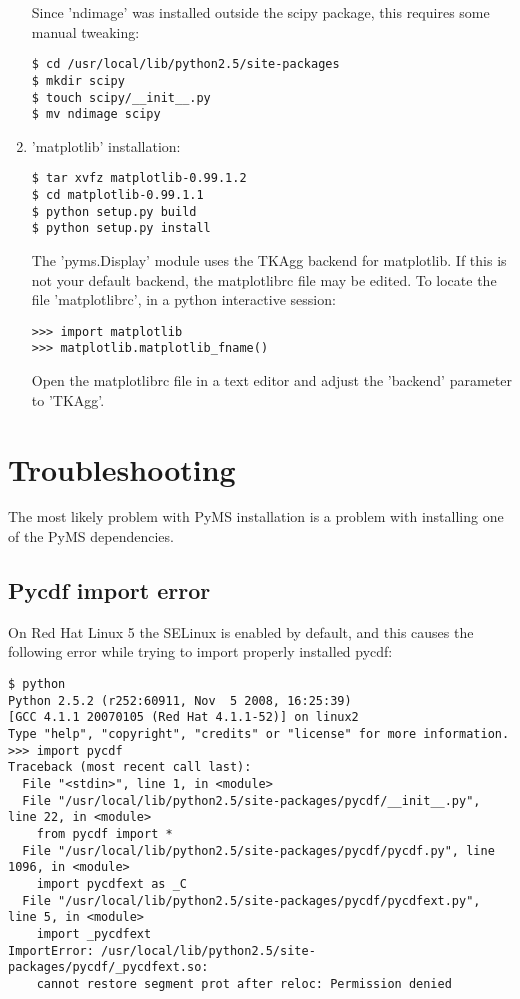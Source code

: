 \begin{enumerate}
\noindent
Since 'ndimage' was installed outside the scipy package, this requires
some manual tweaking:

\begin{verbatim}
$ cd /usr/local/lib/python2.5/site-packages
$ mkdir scipy
$ touch scipy/__init__.py
$ mv ndimage scipy
\end{verbatim}

\item 'matplotlib' installation:

\begin{verbatim}
$ tar xvfz matplotlib-0.99.1.2
$ cd matplotlib-0.99.1.1
$ python setup.py build
$ python setup.py install
\end{verbatim}

\noindent
The 'pyms.Display' module uses the TKAgg backend for matplotlib. If
this is not your default backend, the matplotlibrc file may be edited.
To locate the file 'matplotlibrc', in a python interactive session:

\begin{verbatim}
>>> import matplotlib
>>> matplotlib.matplotlib_fname()
\end{verbatim}

\noindent
Open the matplotlibrc file in a text editor and adjust the 'backend'
parameter to 'TKAgg'.

\end{enumerate}

\section{Troubleshooting}

The most likely problem with PyMS installation is a problem with
installing one of the PyMS dependencies.

\subsection{Pycdf import error}

On Red Hat Linux 5 the SELinux is enabled by default, and this causes the
following error while trying to import properly installed pycdf:

\begin{verbatim}
$ python
Python 2.5.2 (r252:60911, Nov  5 2008, 16:25:39)
[GCC 4.1.1 20070105 (Red Hat 4.1.1-52)] on linux2
Type "help", "copyright", "credits" or "license" for more information.
>>> import pycdf
Traceback (most recent call last):
  File "<stdin>", line 1, in <module>
  File "/usr/local/lib/python2.5/site-packages/pycdf/__init__.py", line 22, in <module>
    from pycdf import *
  File "/usr/local/lib/python2.5/site-packages/pycdf/pycdf.py", line 1096, in <module>
    import pycdfext as _C
  File "/usr/local/lib/python2.5/site-packages/pycdf/pycdfext.py", line 5, in <module>
    import _pycdfext
ImportError: /usr/local/lib/python2.5/site-packages/pycdf/_pycdfext.so:
    cannot restore segment prot after reloc: Permission denied
\end{verbatim}

